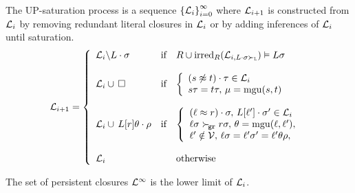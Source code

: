    \begin{definition}[UP-Saturation]

            The UP-{saturation process}
            is a sequence \( {\{ \mathcal{L}_i \}}_{i=0}^\infty \)
            where \( \mathcal{L}_{i+1} \) is constructed from \( \mathcal{L}_i \)
            by removing redundant literal closures in \( \mathcal{L}_i \)
            or by adding inferences of \( \mathcal{L}_i \) until saturation.
           \begin{gather*}
           \mathcal{L}_{i+1} = \left \{
                   \begin{array}{lclc}
                       \mathcal{L}_i \backslash L\cdot\sigma
                        &\text{if}
                        &R \cup \operatorname{irred}_R(\mathcal{L}_{i,L\cdot\sigma\mathrel\succ_{\mathtt{L}}}) \vDash L\sigma
                       \\
                       \\
                       \mathcal{L}_i \cup \, \square
                        &\text{if}
                        &\left \{ \begin{array}{l}
                            (s\not\approx t)\cdot\tau\in\mathcal{L}_i
                           \\
                            s\tau = t\tau,\,
                           \mu=\operatorname{mgu}(s,t)
                       \end{array}\right.
                       \\
                       \\
                       \mathcal{L}_i \cup{} \, L[r]\theta\cdot\rho{}
                        &\text{if}
                        &\left \{ \begin{array}{l}
                            (\ell\approx r)\cdot\sigma,\,
                            L[\ell']\cdot\sigma'\in\mathcal{L}_i
                           \\
                           \ell\sigma\mathrel\succ_{\!\mathtt{gr}} r\sigma,\,
                           \theta=\operatorname{mgu}(\ell,\ell'),
                           \\
                           \ell'\notin\mathcal{V},\,
                           \ell\sigma = \ell'\sigma' = \ell'\theta\rho,
                       \end{array}\right.
                       \\
                       \\
                       \mathcal{L}_i
                        &&\text{otherwise}
                   \end{array}
               \right.
               \end{gather*}

            The set of persistent closures \( \mathcal{L}^\infty \) is the lower limit of \( \mathcal{L}_i \).

   \end{definition}

